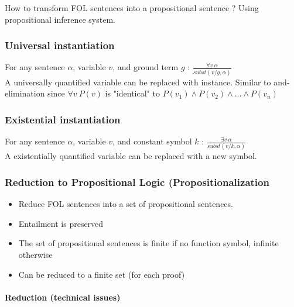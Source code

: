 How to transform FOL sentences into a propositional sentence ? Using propositional inference system.

\subsubsection{Universal instantiation}

For any sentence $\alpha$, variable $v$, and ground term $g$ : $\frac{\forall v \ \alpha}{subst({v/g}, \alpha)}$\\
A universally quantified variable can be replaced with  instance. Similar to and-elimination since $\forall v \ P(v)$ is "identical" to $P(v_1) \land P(v_2) \land ... \land P(v_n)$

\subsubsection{Existential instantiation}

For any sentence $\alpha$, variable $v$, and  constant symbol $k$ : $\frac{\exists v \ \alpha}{subst({v/k}, \alpha)}$\\
A existentially quantified variable can be replaced with a new symbol.

\subsubsection[Reduction to Propositional Logic]{Reduction to Propositional Logic (Propositionalization}

\begin{itemize}
\item Reduce FOL sentences into a set of propositional sentences.
\item Entailment is preserved
\item The set of propositional sentences is finite if no function symbol, infinite otherwise
\item Can be reduced to a finite set (for each proof)
\end{itemize}

\paragraph{Reduction (technical issues)}

